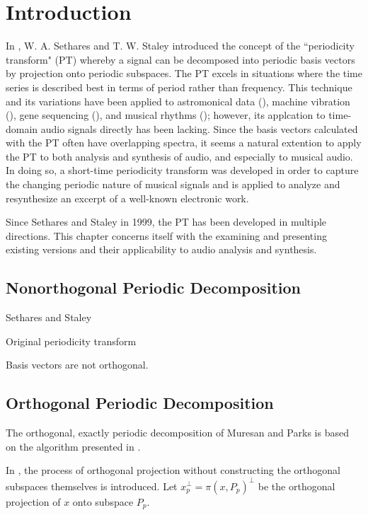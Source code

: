 \chapter{Introduction}

In \cite{sethares1999periodicity}, W. A. Sethares and T. W. Staley introduced the concept of the ``periodicity transform" (PT) whereby a signal can be decomposed into periodic basis vectors by projection onto periodic subspaces. The PT excels in situations where the time series is described best in terms of period rather than frequency. This technique and its variations have been applied to astromonical data (\cite{buccheri1985time}), machine vibration (\cite{muresan2003orthogonal}), gene sequencing (\cite{arora2007detection}), and musical rhythms (\cite{sethares2001meter}); however, its applcation to time-domain audio signals directly has been lacking. Since the basis vectors calculated with the PT often have overlapping spectra, it seems a natural extention to apply the PT to both analysis and synthesis of audio, and especially to musical audio. In doing so, a short-time periodicity transform was developed in order to capture the changing periodic nature of musical signals and is applied to analyze and resynthesize an excerpt of a well-known electronic work.


Since Sethares and Staley in 1999, the PT has been developed in multiple directions. This chapter concerns itself with the examining and presenting existing versions and their applicability to audio analysis and synthesis.

\section{Nonorthogonal Periodic Decomposition}
Sethares and Staley

Original periodicity transform

Basis vectors are not orthogonal.

\section{Orthogonal Periodic Decomposition}

The orthogonal, exactly periodic decomposition of Muresan and Parks is based on the algorithm presented in \cite{wise1976maximum}.

In \cite{muresan2003orthogonal}, the process of orthogonal projection without constructing the orthogonal subspaces themselves is introduced. Let $x_p^\perp = \pi(x, P_p)^\perp$ be the orthogonal projection of $x$ onto subspace $P_p$.

